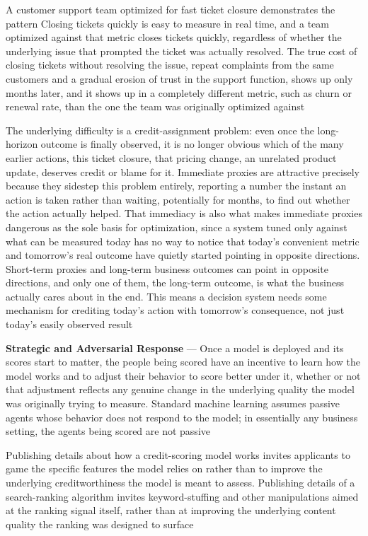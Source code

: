 A customer support team optimized for fast ticket closure demonstrates the pattern
Closing tickets quickly is easy to measure in real time, and a team optimized
against that metric closes tickets quickly, regardless of whether the underlying
issue that prompted the ticket was actually resolved. The true cost of closing
tickets without resolving the issue, repeat complaints from the same customers and
a gradual erosion of trust in the support function, shows up only months later, and
it shows up in a completely different metric, such as churn or renewal rate, than
the one the team was originally optimized against

The underlying difficulty is a credit-assignment problem: even once the long-horizon
outcome is finally observed, it is no longer obvious which of the many earlier
actions, this ticket closure, that pricing change, an unrelated product update,
deserves credit or blame for it. Immediate proxies are attractive precisely because
they sidestep this problem entirely, reporting a number the instant an action is
taken rather than waiting, potentially for months, to find out whether the
action actually helped. That immediacy is also what makes immediate proxies dangerous
as the sole basis for optimization, since a system tuned only against what can
be measured today has no way to notice that today's convenient metric and
tomorrow's real outcome have quietly started pointing in opposite directions. Short-term
proxies and long-term business outcomes can point in opposite directions, and
only one of them, the long-term outcome, is what the business actually cares
about in the end. This means a decision system needs some mechanism for crediting
today's action with tomorrow's consequence, not just today's easily observed
result

\textbf{Strategic and Adversarial Response} --- Once a model is deployed and its
scores start to matter, the people being scored have an incentive to learn how the
model works and to adjust their behavior to score better under it, whether or
not that adjustment reflects any genuine change in the underlying quality the
model was originally trying to measure. Standard machine learning assumes passive
agents whose behavior does not respond to the model; in essentially any business
setting, the agents being scored are not passive

Publishing details about how a credit-scoring model works invites applicants to
game the specific features the model relies on rather than to improve the
underlying creditworthiness the model is meant to assess. Publishing details of a
search-ranking algorithm invites keyword-stuffing and other manipulations aimed at
the ranking signal itself, rather than at improving the underlying content
quality the ranking was designed to surface

